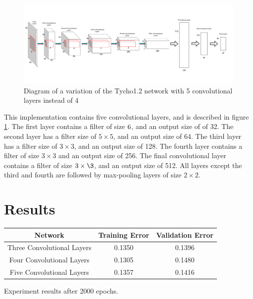 \documentclass[12pt,a4paper,oneside,oldfontcommands]{memoir}
\begin{document}
\begin{Declaration Of OriginalityOrginality}
\begin{figure}[H]
  \centering
    \includegraphics[width=\linewidth]{images/conv5.png}
    \caption{Diagram of a variation of the Tycho1.2 network with 5 convolutional layers instead of 4}
       \label{fig:conv5}
\end{figure}

This implementation contains five convolutional layers, and is described in figure \ref{fig:conv5}. The first layer contains a filter of size \(6\time6\), and an output size of of 32. The second layer has a filter size of \(5\times5\), and an output size of 64. The third layer has a filter size of \(3\times3\), and an output size of 128. The fourth layer contains a filter of size \(3\times3\) and an output size of 256. The final convolutional layer contains a filter of size \(3\times\3\), and an output size of 512. All layers except the third and fourth are followed by max-pooling layers of size \(2\times2\).

\section{Results}

\begin{center} \label{val-table-conv}
 \begin{tabular}{||c | c | c||} 
 \hline
 Network & Training Error & Validation Error \\ [0.5ex] 
 \hline\hline
 Three Convolutional Layers & 0.1350 & 0.1396\\ 
 \hline
 Four Convolutional Layers & 0.1305 & 0.1480\\
 \hline
 Five Convolutional Layers & 0.1357 & 0.1416\\
 \hline
\end{tabular}
\caption{Experiment results after 2000 epochs.}
\end{center}


\end{Declaration Of OriginalityOrginality}
\end{document}
